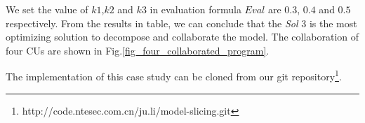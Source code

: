 We set the value of $k1$,$k2$ and $k3$ in evaluation formula $Eval$ are $0.3$, $0.4$ and $0.5$ respectively. From the results in table, we can conclude that the \emph{Sol} 3 is the most optimizing solution to decompose and collaborate the model. The collaboration of four CUs are shown in Fig.\ref{fig_four_collaborated_program}.

The implementation of this case study can be cloned from our git repository\footnote{http://code.ntesec.com.cn/ju.li/model-slicing.git}.


%
%
%



%
%
%
%

